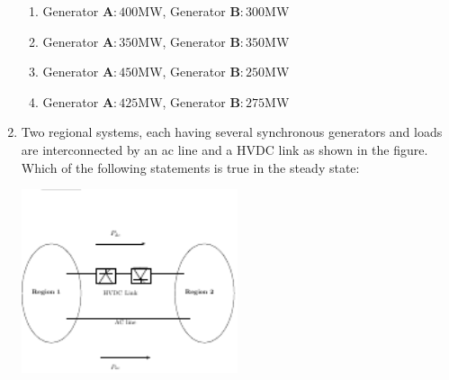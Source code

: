 \documentclass[journal,12pt,onecolumn]{IEEEtran}
\theoremstyle{remark}
\begin{document}
\begin{enumerate}
    \begin{enumerate}
        \item Generator $\mathbf{A} \colon 400$MW, Generator $\mathbf{B} \colon 300$MW
         \item Generator $\mathbf{A} \colon 350$MW, Generator $\mathbf{B} \colon 350$MW
          \item Generator $\mathbf{A} \colon 450$MW, Generator $\mathbf{B} \colon 250$MW
           \item Generator $\mathbf{A} \colon 425$MW, Generator $\mathbf{B} \colon 275$MW\\
    \end{enumerate}
    \item Two regional systems, each having several synchronous generators and loads are interconnected by an ac line and a HVDC link as shown in the figure. Which of the following statements is true in the steady state:
	     \begin{center}
\includegraphics[width=0.5\textwidth]{figs/fig5/main} %
\end{center}


\end{enumerate}
\end{document}
